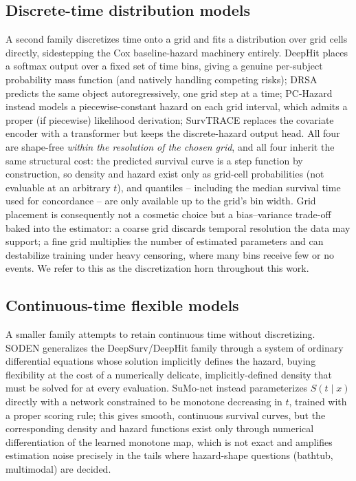 \documentclass[11pt]{article}
\begin{document}
\subsection{Discrete-time distribution models}
A second family discretizes time onto a grid and fits a
distribution over grid cells directly, sidestepping the Cox
baseline-hazard machinery entirely. DeepHit \citep{lee2018deephit} places
a softmax output over a fixed set of time bins, giving a genuine
per-subject probability mass function (and natively handling competing
risks); DRSA \citep{ren2019drsa} predicts the same object
autoregressively, one grid step at a time; PC-Hazard
\citep{kvamme2021pchazard} instead models a piecewise-constant hazard on
each grid interval, which admits a proper (if piecewise) likelihood
derivation; SurvTRACE \citep{wang2022survtrace} replaces the covariate
encoder with a transformer but keeps the discrete-hazard output head. All
four are shape-free \emph{within the resolution of the chosen grid}, and
all four inherit the same structural cost: the predicted survival curve is
a step function by construction, so density and hazard exist only as
grid-cell probabilities (not evaluable at an arbitrary $t$), and quantiles
-- including the median survival time used for concordance -- are only
available up to the grid's bin width. Grid placement is consequently not a
cosmetic choice but a bias--variance trade-off baked into the estimator:
a coarse grid discards temporal resolution the data may support; a fine
grid multiplies the number of estimated parameters and can destabilize
training under heavy censoring, where many bins receive few or no events.
We refer to this as the discretization horn throughout this work.

\subsection{Continuous-time flexible models}
A smaller family attempts to retain continuous time without discretizing.
SODEN \citep{tang2022soden} generalizes the DeepSurv/DeepHit family
through a system of ordinary differential equations whose solution
implicitly defines the hazard, buying flexibility at the cost of a
numerically delicate, implicitly-defined density that must be solved for
at every evaluation. SuMo-net \citep{rindt2022sumonet} instead
parameterizes $S(t\mid x)$ directly with a network constrained to be
monotone decreasing in $t$, trained with a proper scoring rule; this gives
smooth, continuous survival curves, but the corresponding density and
hazard functions exist only through numerical differentiation of the
learned monotone map, which is not exact and amplifies estimation noise
precisely in the tails where hazard-shape questions (bathtub, multimodal)
are decided.
\end{document}
